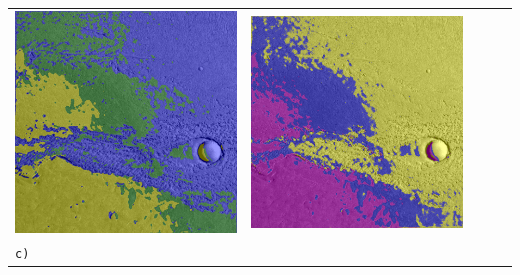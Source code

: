 \begin{table}[h!]
\begin{tabularx}{\textwidth}{>{\centering}m{}
			>{\centering}m{}
			>{\centering}m{}
			>{\centering}m{}
			>{\centering\arraybackslash}m{}}
		\includegraphics[width=0.9\linewidth]{images/gen/fully_connected/p03_02.png_1.png} &
		\includegraphics[width=0.9\linewidth]{images/gen/fully_connected/p03_02.png_2.png} \\
		\texttt{c)} &

\end{tabularx}
\end{table}
